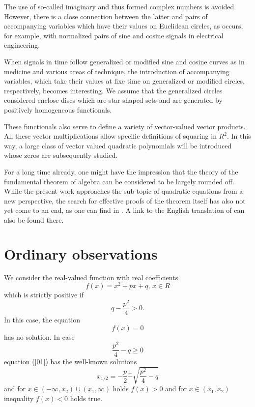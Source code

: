 \documentclass{amsart}
\theoremstyle{definition}
\theoremstyle{remark}
\numberwithin{equation}{section}
\begin{document}
The use of so-called imaginary and thus formed complex numbers is avoided. However, there is a close connection between the latter and pairs of accompanying variables which have their values on Euclidean circles, as occurs, for example, with normalized pairs of sine and cosine signals in electrical engineering.

When signals in time  follow generalized or modified sine and cosine curves as in medicine and various areas of technique, the introduction of accompanying variables, which take their values at fixe time on generalized or modified circles, respectively, becomes interesting. We assume that the generalized circles considered enclose discs which are star-shaped sets and are generated by positively homogeneous functionals.

These functionals also serve to define a variety of vector-valued vector products.
All these vector multiplications allow specific definitions of squaring in $R^2$. In this way, a large class of vector valued quadratic polynomials will be introduced whose zeros are subsequently studied.

 For a long time already, one might have the impression that the theory of the fundamental theorem of algebra can be considered to be largely rounded off. While the present work approaches the sub-topic of quadratic equations from a new perspective, the search for effective proofs of the theorem itself has also not yet come to an end, as one can find in \cite{NoMa}. A link to the English translation of \cite{Gauss1799} can also be found there.


\section{Ordinary observations}
We consider the real-valued function with real coefficients
\[f(x)=x^2+px+q,\,x\in R\]
which is strictly positive if
\begin{equation}\label{pos1}
q-\frac{p^2}{4}>0.
\end{equation}
In this case, the equation
\begin{equation}\label{01}
f(x)=0
\end{equation}
has no solution. In case
\begin{equation}\label{nonneg}
\frac{p^2}{4}-q\geq 0
\end{equation}
equation (\ref{01}) has the well-known solutions
\begin{equation}\label{Lsg1}
x_{1/2}=-\frac{p}{2} \overset{+}{-}\sqrt{\frac{p^2}{4}-q}
\end{equation}
and for $x\in (-\infty,x_2)\cup(x_1,\infty)$ holds $f(x)>0$ and for $x\in(x_1,x_2)$ inequality $f(x)<0$ holds true.
\end{document}
